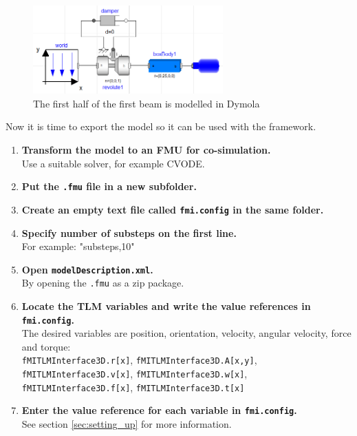 \documentclass[11pt,a4paper,english]{report}
\begin{document}
\begin{figure}[ht]
\centering
\includegraphics[width=0.65\textwidth]{gfx/model_dymola.png}
\caption{The first half of the first beam is modelled in Dymola}
\label{fig:model_dymola}
\end{figure}

Now it is time to export the model so it can be used with the framework.
\begin{enumerate}
\item \textbf{Transform the model to an FMU for co-simulation.}\\
      Use a suitable solver, for example CVODE.
\item \textbf{Put the \texttt{.fmu} file in a new subfolder.}
\item \textbf{Create an empty text file called \texttt{fmi.config} in the same folder.}
\item \textbf{Specify number of substeps on the first line.}\\
              For example: "substeps,10"
\item \textbf{Open \texttt{modelDescription.xml}.}\\
              By opening the \texttt{.fmu} as a zip package.
\item \textbf{Locate the TLM variables and write the value references in \texttt{fmi.config}.}\\
              The desired variables are position, orientation, velocity, angular velocity, force and torque:\\
              \texttt{fMITLMInterface3D.r[x]}, \texttt{fMITLMInterface3D.A[x,y]},\\
              \texttt{fMITLMInterface3D.v[x]}, \texttt{fMITLMInterface3D.w[x]},\\
              \texttt{fMITLMInterface3D.f[x]}, \texttt{fMITLMInterface3D.t[x]}
\item \textbf{Enter the value reference for each variable in \texttt{fmi.config}.}\\
              See section \cref{sec:setting_up} for more information.              
\end{enumerate}
\end{document}
